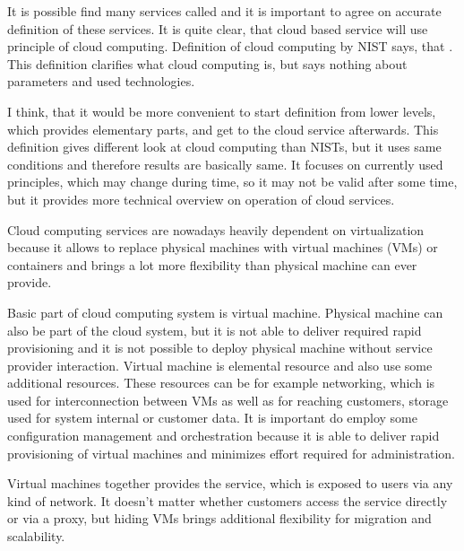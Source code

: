 
It is possible find many services called  and it is important to agree on accurate definition of these services. It is quite clear, that cloud based service will use principle of cloud computing. Definition of cloud computing by \Ac{NIST} says, that  \cite{cloud-definition}. This definition clarifies what cloud computing is, but says nothing about parameters and used technologies.

I think, that it would be more convenient to start definition from lower levels, which provides elementary parts, and get to the cloud service afterwards. This definition gives different look at cloud computing than \Ac{NIST}s, but it uses same conditions and therefore results are basically same. It focuses on currently used principles, which may change during time, so it may not be valid after some time, but it provides more technical overview on operation of cloud services.

Cloud computing services are nowadays heavily dependent on virtualization because it allows to replace physical machines with virtual machines (\Ac{VM}s) or containers and brings a lot more flexibility than physical machine can ever provide.

Basic part of cloud computing system is virtual machine. Physical machine can also be part of the cloud system, but it is not able to deliver required rapid provisioning and it is not possible to deploy physical machine without service provider interaction. Virtual machine is elemental resource and also use some additional resources. These resources can be for example networking, which is used for interconnection between \Ac{VM}s as well as for reaching customers, storage used for system internal or customer data. It is important do employ some configuration management and orchestration because it is able to deliver rapid provisioning of virtual machines and minimizes effort required for administration.

Virtual machines together provides the service, which is exposed to users via any kind of network. It doesn't matter whether customers access the service directly or via a proxy, but hiding \Ac{VM}s brings additional flexibility for migration and scalability. 

